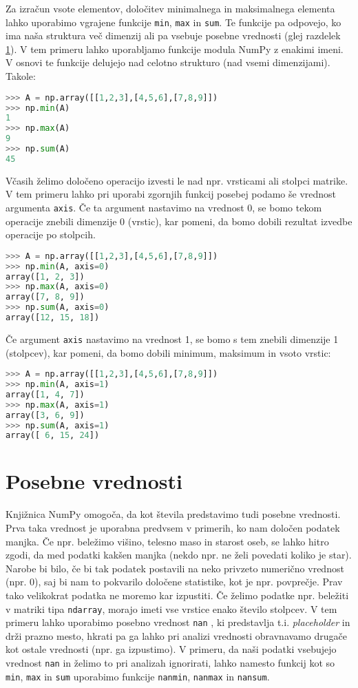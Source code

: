 Za izračun vsote elementov, določitev minimalnega in maksimalnega elementa lahko uporabimo vgrajene funkcije \texttt{min}, \texttt{max} in \texttt{sum}. Te funkcije pa odpovejo, ko ima naša struktura več dimenzij ali pa vsebuje posebne vrednosti (glej razdelek \ref{sec:np_nan}). V tem primeru lahko uporabljamo funkcije modula NumPy z enakimi imeni. V osnovi te funkcije delujejo nad celotno strukturo (nad vsemi dimenzijami). Takole:
\begin{lstlisting}[language=Python]
>>> A = np.array([[1,2,3],[4,5,6],[7,8,9]])
>>> np.min(A)
1
>>> np.max(A)
9
>>> np.sum(A)
45
\end{lstlisting}
Včasih želimo določeno operacijo izvesti le nad npr. vrsticami ali stolpci matrike. V tem primeru lahko pri uporabi zgornjih funkcij posebej podamo še vrednost argumenta \texttt{axis}. Če ta argument nastavimo na vrednost 0, se bomo tekom operacije znebili dimenzije 0 (vrstic), kar pomeni, da bomo dobili rezultat izvedbe operacije po stolpcih. %
\begin{lstlisting}[language=Python]
>>> A = np.array([[1,2,3],[4,5,6],[7,8,9]])
>>> np.min(A, axis=0)
array([1, 2, 3])
>>> np.max(A, axis=0)
array([7, 8, 9])
>>> np.sum(A, axis=0)
array([12, 15, 18])
\end{lstlisting}
Če argument \texttt{axis} nastavimo na vrednost 1, se bomo s tem znebili dimenzije 1 (stolpcev), kar pomeni, da bomo dobili minimum, maksimum in vsoto vrstic:%
\begin{lstlisting}[language=Python]
>>> A = np.array([[1,2,3],[4,5,6],[7,8,9]])
>>> np.min(A, axis=1)
array([1, 4, 7])
>>> np.max(A, axis=1)
array([3, 6, 9])
>>> np.sum(A, axis=1)
array([ 6, 15, 24])
\end{lstlisting}

\section{Posebne vrednosti}
\label{sec:np_nan}

Knjižnica NumPy omogoča, da kot števila predstavimo tudi posebne vrednosti. Prva taka vrednost je uporabna predvsem v primerih, ko nam določen podatek manjka. Če npr. beležimo višino, telesno maso in starost oseb, se lahko hitro zgodi, da med podatki kakšen manjka (nekdo npr. ne želi povedati koliko je star). Narobe bi bilo, če bi tak podatek postavili na neko privzeto numerično vrednost (npr. 0), saj bi nam to pokvarilo določene statistike, kot je npr. povprečje. Prav tako velikokrat podatka ne moremo kar izpustiti. Če želimo podatke npr. beležiti v matriki tipa \texttt{ndarray}, morajo imeti vse vrstice enako število stolpcev. V tem primeru lahko uporabimo posebno vrednost \texttt{nan} , ki predstavlja t.i. \emph{placeholder} in drži prazno mesto, hkrati pa ga lahko pri analizi vrednosti obravnavamo drugače kot ostale vrednosti (npr. ga izpustimo). V primeru, da naši podatki vsebujejo vrednost \texttt{nan} in želimo to pri analizah ignorirati, lahko namesto funkcij kot so \texttt{min}, \texttt{max} in \texttt{sum} uporabimo funkcije \texttt{nanmin}, \texttt{nanmax} in \texttt{nansum}.

